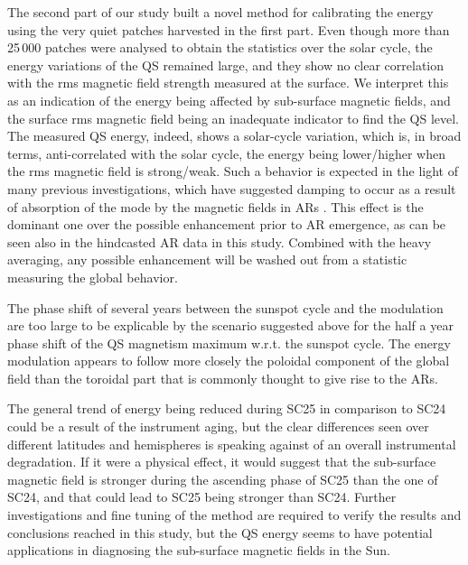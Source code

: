 \documentclass{aa}
\begin{document}

The second part of our study built a novel method for calibrating the \fff energy using the very quiet patches harvested in the first part. Even though more than 25\,000 patches were analysed to obtain the statistics over the solar cycle, the \fff energy variations of the QS remained large, and they show no clear correlation with the 
rms magnetic field strength
measured at the surface. We interpret this as an indication of the \fff energy being affected by sub-surface magnetic fields, and the surface rms magnetic field being an inadequate indicator to find the QS level. 
The measured QS \fff energy, indeed, shows a solar-cycle variation, which is, in broad terms, anti-correlated with the solar cycle, the \fff energy being lower/higher when the
rms
magnetic field is strong/weak.
Such a behavior is expected in the light of many previous investigations, which have suggested \fff damping to occur as a result of absorption of the \fff mode by the magnetic fields in ARs \citep{Cally+94,CB97,SRB16}. This effect is the dominant one over the
possible enhancement prior to AR emergence,
as can be seen also in the hindcasted AR data in this 
study. Combined with the heavy averaging, any possible enhancement 
will be washed out from a statistic measuring the global behavior.

The phase shift of several years between the sunspot cycle and the \fff modulation are too large to be explicable by the scenario suggested above for the half a year phase shift of the QS magnetism maximum w.r.t. the sunspot cycle. The \fff energy modulation appears to follow more closely the poloidal component of the global field than the toroidal part that is commonly thought to give rise to the ARs. 

The general trend of \fff energy being reduced during SC25 in comparison to SC24 could be a result of the instrument aging, but the clear differences seen over different latitudes and hemispheres is speaking against of an overall instrumental degradation. If it were a physical effect, it would suggest that the sub-surface magnetic field is stronger during the ascending phase of SC25 than the one of SC24, and that could lead to SC25 being stronger than SC24. Further investigations and fine tuning of the method are required to verify the results and conclusions reached in this study, but the QS \fff energy seems to have potential applications in diagnosing the sub-surface magnetic fields in the Sun.
\end{document}
